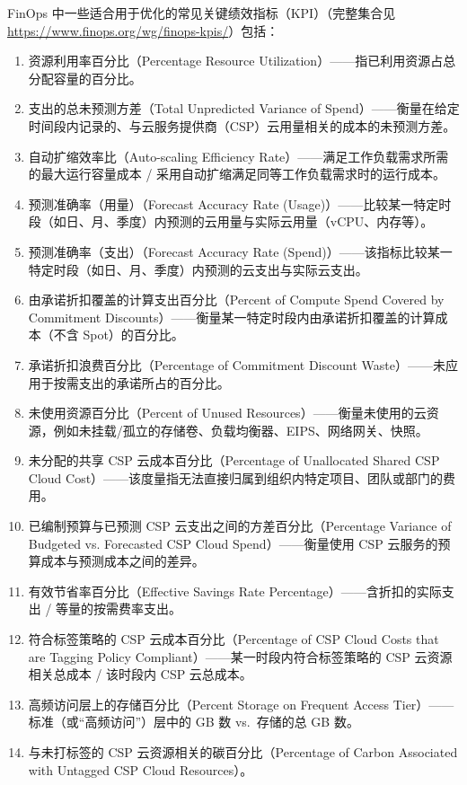 FinOps 中一些适合用于优化的常见关键绩效指标（KPI）（完整集合见 \url{https://www.finops.org/wg/finops-kpis/}）包括：

\begin{enumerate}
\item 资源利用率百分比（Percentage Resource Utilization）——指已利用资源占总分配容量的百分比。
\item 支出的总未预测方差（Total Unpredicted Variance of Spend）——衡量在给定时间段内记录的、与云服务提供商（CSP）云用量相关的成本的未预测方差。
\item 自动扩缩效率比（Auto-scaling Efficiency Rate）——满足工作负载需求所需的最大运行容量成本 / 采用自动扩缩满足同等工作负载需求时的运行成本。
\item 预测准确率（用量）（Forecast Accuracy Rate (Usage)）——比较某一特定时段（如日、月、季度）内预测的云用量与实际云用量（vCPU、内存等）。
\item 预测准确率（支出）（Forecast Accuracy Rate (Spend)）——该指标比较某一特定时段（如日、月、季度）内预测的云支出与实际云支出。
\item 由承诺折扣覆盖的计算支出百分比（Percent of Compute Spend Covered by Commitment Discounts）——衡量某一特定时段内由承诺折扣覆盖的计算成本（不含 Spot）的百分比。
\item 承诺折扣浪费百分比（Percentage of Commitment Discount Waste）——未应用于按需支出的承诺所占的百分比。
\item 未使用资源百分比（Percent of Unused Resources）——衡量未使用的云资源，例如未挂载/孤立的存储卷、负载均衡器、EIPS、网络网关、快照。
\item 未分配的共享 CSP 云成本百分比（Percentage of Unallocated Shared CSP Cloud Cost）——该度量指无法直接归属到组织内特定项目、团队或部门的费用。
\item 已编制预算与已预测 CSP 云支出之间的方差百分比（Percentage Variance of Budgeted vs. Forecasted CSP Cloud Spend）——衡量使用 CSP 云服务的预算成本与预测成本之间的差异。
\item 有效节省率百分比（Effective Savings Rate Percentage）——含折扣的实际支出 / 等量的按需费率支出。
\item 符合标签策略的 CSP 云成本百分比（Percentage of CSP Cloud Costs that are Tagging Policy Compliant）——某一时段内符合标签策略的 CSP 云资源相关总成本 / 该时段内 CSP 云总成本。
\item 高频访问层上的存储百分比（Percent Storage on Frequent Access Tier）——标准（或“高频访问”）层中的 GB 数 vs.\ 存储的总 GB 数。
\item 与未打标签的 CSP 云资源相关的碳百分比（Percentage of Carbon Associated with Untagged CSP Cloud Resources）。
\end{enumerate}


